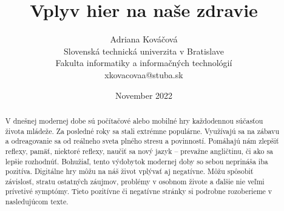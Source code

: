 \documentclass[10pt,twoside,slovak,a4paper]{article}
\title{Vplyv hier na naše zdravie}
\author{Adriana Kováčová\\
	{\small Slovenská technická univerzita v Bratislave}\\
	{\small Fakulta informatiky a informačných technológií}\\
	{\small {xkovacovaa@stuba.sk}}
	}
\date{November 2022}
\begin{document}
\maketitle
\begin{abstract}
V dnešnej modernej dobe sú počítačové alebo mobilné hry každodennou súčasťou života mládeže. Za posledné roky sa stali extrémne populárne. Využívajú sa na zábavu a odreagovanie sa od reálneho sveta plného stresu a povinností. Pomáhajú nám zlepšiť reflexy, pamäť, niektoré reflexy, naučiť sa nový jazyk – prevažne angličtinu, či ako sa lepšie rozhodnúť. Bohužiaľ, tento výdobytok modernej doby so sebou neprináša iba pozitíva.
Digitálne hry môžu na náš život vplývať aj negatívne. Môžu spôsobiť závislosť, stratu ostatných záujmov, problémy v osobnom živote a ďalšie nie veľmi prívetivé symptómy. Tieto pozitívne či negatívne stránky si podrobne rozoberieme v nasledujúcom texte.

\end{abstract}
\end{document}
